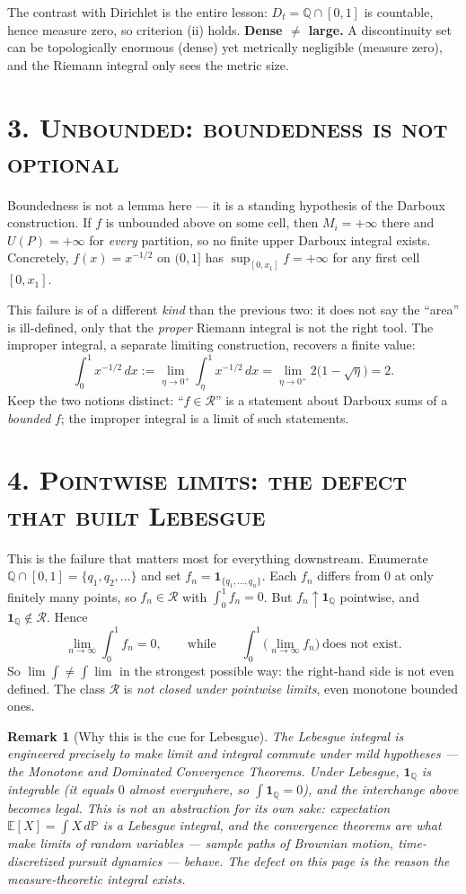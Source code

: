 \documentclass[11pt]{article}
\theoremstyle{atlas}
\newtheorem{remark}{Remark}
\newcommand{\Q}{\mathbb{Q}}
\newcommand{\Rint}{\mathcal{R}}
\begin{document}
The contrast with Dirichlet is the entire lesson: $D_t=\Q\cap[0,1]$ is countable, hence
measure zero, so criterion (ii) holds. \textbf{Dense $\ne$ large.} A discontinuity set
can be topologically enormous (dense) yet metrically negligible (measure zero), and the
Riemann integral only sees the metric size.

\section*{\scshape 3. Unbounded: boundedness is not optional}

Boundedness is not a lemma here --- it is a standing hypothesis of the Darboux
construction. If $f$ is unbounded above on some cell, then $M_i=+\infty$ there and
$U(P)=+\infty$ for \emph{every} partition, so no finite upper Darboux integral exists.
Concretely, $f(x)=x^{-1/2}$ on $(0,1]$ has $\sup_{[0,x_1]}f=+\infty$ for any first cell
$[0,x_1]$.

This failure is of a different \emph{kind} than the previous two: it does not say the
``area'' is ill-defined, only that the \emph{proper} Riemann integral is not the right
tool. The improper integral, a separate limiting construction, recovers a finite value:
\[
  \int_0^1 x^{-1/2}\,dx:=\lim_{\eta\to 0^+}\int_\eta^1 x^{-1/2}\,dx
  =\lim_{\eta\to0^+}2\big(1-\sqrt{\eta}\big)=2.
\]
Keep the two notions distinct: ``$f\in\Rint$'' is a statement about Darboux sums of a
\emph{bounded} $f$; the improper integral is a limit of such statements.

\section*{\scshape 4. Pointwise limits: the defect that built Lebesgue}

This is the failure that matters most for everything downstream. Enumerate
$\Q\cap[0,1]=\{q_1,q_2,\dots\}$ and set $f_n=\mathbf 1_{\{q_1,\dots,q_n\}}$. Each $f_n$
differs from $0$ at only finitely many points, so $f_n\in\Rint$ with $\int_0^1 f_n=0$.
But $f_n\uparrow \mathbf 1_{\Q}$ pointwise, and $\mathbf 1_{\Q}\notin\Rint$. Hence
\[
  \lim_{n\to\infty}\int_0^1 f_n=0,
  \qquad\text{while}\qquad
  \int_0^1 \Big(\lim_{n\to\infty} f_n\Big)\ \text{does not exist.}
\]
So $\lim\int\neq\int\lim$ in the strongest possible way: the right-hand side is not even
defined. The class $\Rint$ is \emph{not closed under pointwise limits}, even monotone
bounded ones.

\begin{remark}[Why this is the cue for Lebesgue]
The Lebesgue integral is engineered precisely to make limit and integral commute under
mild hypotheses --- the Monotone and Dominated Convergence Theorems. Under Lebesgue,
$\mathbf 1_{\Q}$ \emph{is} integrable (it equals $0$ almost everywhere, so
$\int \mathbf 1_{\Q}=0$), and the interchange above becomes legal. This is not an
abstraction for its own sake: expectation $\mathbb E[X]=\int X\,d\mathbb P$ is a Lebesgue
integral, and the convergence theorems are what make limits of random variables ---
sample paths of Brownian motion, time-discretized pursuit dynamics --- behave. The
defect on this page is the reason the measure-theoretic integral exists.
\end{remark}
\end{document}
